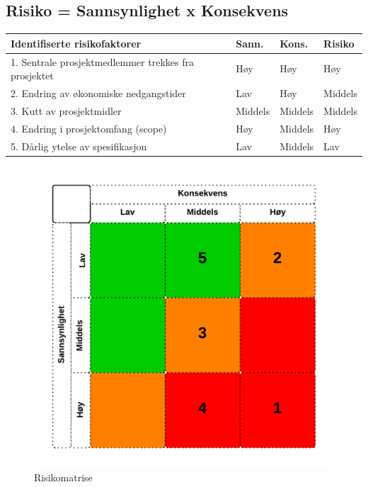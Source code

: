 	\clearpage
	\subsection{Risiko = Sannsynlighet x Konsekvens}

		\begin{tabular}{ p{8cm} l l l}
			\hline
			Identifiserte risikofaktorer & Sann. & Kons. & Risiko \\ \hline
			1. Sentrale prosjektmedlemmer trekkes fra prosjektet & Høy & Høy & Høy\\
			2. Endring av økonomiske nedgangstider & Lav & Høy & Middels \\
			3. Kutt av prosjektmidler & Middels & Middels & Middels \\
			4. Endring i prosjektomfang (scope) & Høy & Middels & Høy \\
			5. Dårlig ytelse av spesifikasjon & Lav & Middels & Lav \\
			\hline
		\end{tabular}

		\begin{figure}[H]
			\includegraphics[width=\textwidth]{riskMatrix.png}
			\caption{Risikomatrise}
		\end{figure}

